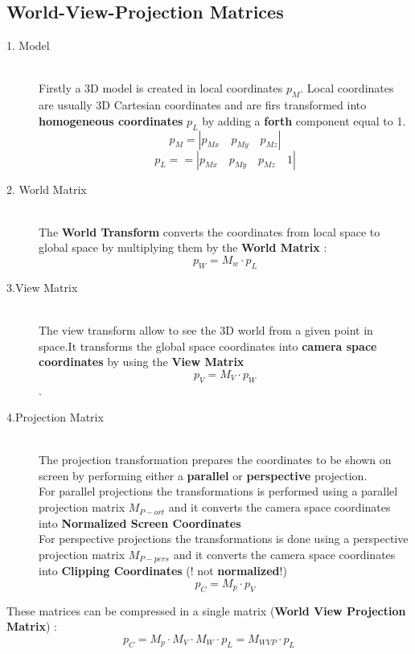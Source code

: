 \subsection{World-View-Projection Matrices}
\begin{description}
\item[1. Model]\hfill\\
 Firstly a 3D model is created in local coordinates $p_M$. Local coordinates are usually 3D Cartesian coordinates and are firs transformed into\textbf{ homogeneous coordinates} $p_L$ by adding a \textbf{forth} component equal to 1.\\
 $$ p_M = |p_{Mx} \quad p_{My} \quad p_{Mz}|$$
 $$p_L = = |p_{Mx} \quad p_{My} \quad p_{Mz} \quad 1|$$
\item [2. World Matrix]\hfill\\
The \textbf{World Transform} converts the coordinates from local space to global space by multiplying them by the \textbf{World Matrix} : 
$$ p_W = M_w \cdot p_L$$
\item[3.View Matrix]\hfill\\
The view transform allow to see the 3D world from a given point in space.It transforms the global space coordinates into \textbf{camera space coordinates} by using the \textbf{View Matrix} $$ p_V = M_V \cdot p_W$$.
\item[4.Projection Matrix]\hfill\\
The projection transformation prepares the coordinates to be shown on screen by performing either a \textbf{parallel} or \textbf{perspective} projection.\\
For parallel projections the transformations is performed using a parallel projection matrix $M_{P-ort}$ and it converts the camera space coordinates into \textbf{Normalized Screen Coordinates}\\
For perspective projections the transformations is done using a perspective projection matrix $M_{P-pers}$ and it converts the camera space coordinates into \textbf{Clipping Coordinates} (! not \textbf{normalized}!)
$$ p_C = M_p \cdot p_V$$
\end{description}
These matrices can be compressed in a single matrix (\textbf{World View Projection Matrix}) : $$ p_C = M_p \cdot M_V \cdot M_W \cdot p_L = M_{WVP} \cdot p_L$$

